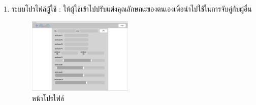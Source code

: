 \begin{enumerate}
  \item ระบบโปรไฟล์ผู้ใช้ : ให้ผู้ใช้เข้าไปปรับแต่งคุณลักษณะของตนเองเพื่อนำไปใช้ในการจับคู่กับผู้อื่น
  \begin{figure}[h]
  \begin{center}
  \includegraphics[width=50mm,scale=0.5]{photo/profile.png}
  \end{center}
  \caption{หน้าโปรไฟล์}
  \label{fig:profile}
  \end{figure}
  
\end{enumerate}

